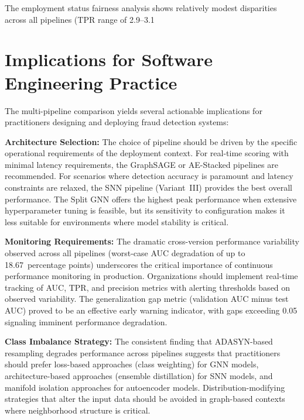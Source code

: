 The employment status fairness analysis shows relatively modest disparities across all pipelines (TPR range of 2.9--3.1%

\section{Implications for Software Engineering Practice}

The multi-pipeline comparison yields several actionable implications for practitioners designing and deploying fraud detection systems:

\textbf{Architecture Selection:} The choice of pipeline should be driven by the specific operational requirements of the deployment context. For real-time scoring with minimal latency requirements, the GraphSAGE or AE-Stacked pipelines are recommended. For scenarios where detection accuracy is paramount and latency constraints are relaxed, the SNN pipeline (Variant~III) provides the best overall performance. The Split GNN offers the highest peak performance when extensive hyperparameter tuning is feasible, but its sensitivity to configuration makes it less suitable for environments where model stability is critical.

\textbf{Monitoring Requirements:} The dramatic cross-version performance variability observed across all pipelines (worst-case AUC degradation of up to 18.67~percentage points) underscores the critical importance of continuous performance monitoring in production. Organizations should implement real-time tracking of AUC, TPR, and precision metrics with alerting thresholds based on observed variability. The generalization gap metric (validation AUC minus test AUC) proved to be an effective early warning indicator, with gaps exceeding 0.05 signaling imminent performance degradation.

\textbf{Class Imbalance Strategy:} The consistent finding that ADASYN-based resampling degrades performance across pipelines suggests that practitioners should prefer loss-based approaches (class weighting) for GNN models, architecture-based approaches (ensemble distillation) for SNN models, and manifold isolation approaches for autoencoder models. Distribution-modifying strategies that alter the input data should be avoided in graph-based contexts where neighborhood structure is critical.

